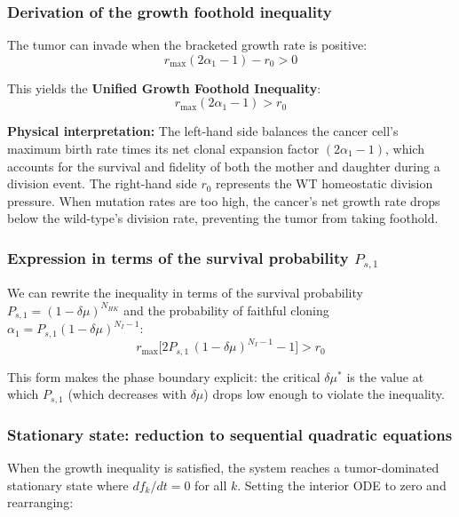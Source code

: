 \documentclass[11pt,a4paper]{article}
\begin{document}
\subsubsection*{Derivation of the growth foothold inequality}

The tumor can invade when the bracketed growth rate is positive:
\begin{equation}
    r_{\text{max}} (2\alpha_1 - 1) - r_0 > 0
\end{equation}

This yields the \textbf{Unified Growth Foothold Inequality}:
\begin{equation}
    \boxed{r_{\text{max}} (2\alpha_1 - 1) > r_0}
\end{equation}

\textbf{Physical interpretation:} The left-hand side balances the cancer cell's maximum birth rate times its net clonal expansion factor $(2\alpha_1 - 1)$, which accounts for the survival and fidelity of both the mother and daughter during a division event. The right-hand side $r_0$ represents the WT homeostatic division pressure. When mutation rates are too high, the cancer's net growth rate drops below the wild-type's division rate, preventing the tumor from taking foothold.

\subsubsection*{Expression in terms of the survival probability $P_{s,1}$}

We can rewrite the inequality in terms of the survival probability $P_{s,1} = (1-\delta\mu)^{N_{HK}}$ and the probability of faithful cloning $\alpha_1 = P_{s,1} (1-\delta\mu)^{N_I-1}$:
\begin{equation}
    \boxed{r_{\text{max}} \Big[ 2 P_{s,1}\,(1-\delta\mu)^{N_I-1} - 1\Big] > r_0}
\end{equation}

This form makes the phase boundary explicit: the critical $\delta\mu^*$ is the value at which $P_{s,1}$ (which decreases with $\delta\mu$) drops low enough to violate the inequality.

\subsubsection*{Stationary state: reduction to sequential quadratic equations}

When the growth inequality is satisfied, the system reaches a tumor-dominated stationary state where $df_k/dt = 0$ for all $k$. Setting the interior ODE to zero and rearranging:
\end{document}
